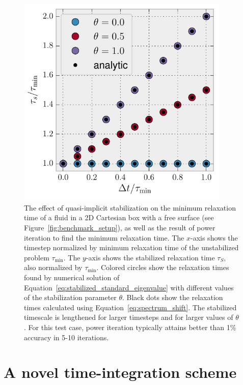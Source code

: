 \documentclass[preprint,12pt,authoryear]{elsarticle}
\begin{document}
\begin{figure}
\includegraphics[width=0.9\textwidth]{figures/perturb_spectrum.pdf}
\caption{The effect of quasi-implicit stabilization on the minimum relaxation time of a fluid in a 2D Cartesian box with a free surface (see Figure~\ref{fig:benchmark_setup}), as well as the result of power iteration to find the minimum relaxation time. The $x$-axis shows the timestep normalized by minimum relaxation time of the unstabilized problem $\tau_\mathrm{\min}$. The $y$-axis shows the stabilized relaxation time $\tau_S$, also normalized by $\tau_\mathrm{min}$. Colored circles show the relaxation times found by numerical solution of Equation~\eqref{eq:stabilized_standard_eigenvalue} with different values of the stabilization parameter $\theta$. Black dots show the relaxation times calculated using Equation~\eqref{eq:spectrum_shift}. The stabilized timescale is lengthened for larger timesteps and for larger values of $\theta$. For this test case, power iteration typically attains better than 1\% accuracy in 5-10 iterations.}
\label{fig:perturb_spectrum}
\end{figure}


\section{A novel time-integration scheme}
\label{sec:newscheme}
\end{document}

